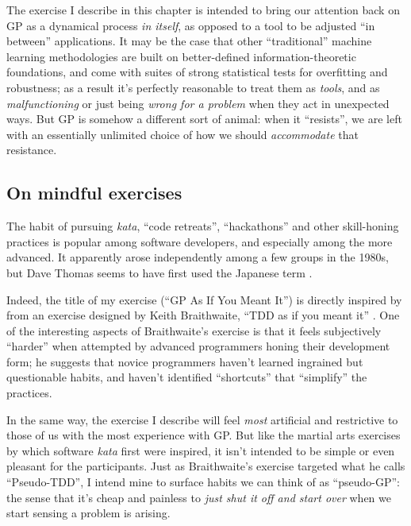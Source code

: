 The exercise I describe in this chapter is intended to bring our attention back on GP as a dynamical process \emph{in itself}, as opposed to a tool to be adjusted ``in between'' applications. It may be the case that other ``traditional'' machine learning methodologies are built on better-defined information-theoretic foundations, and come with suites of strong statistical tests for overfitting and robustness; as a result it's perfectly reasonable to treat them as \emph{tools}, and as \emph{malfunctioning} or just being \emph{wrong for a problem} when they act in unexpected ways. But GP is somehow a different sort of animal: when it ``resists'', we are left with an essentially unlimited choice of how we should \emph{accommodate} that resistance.

\subsection{On mindful exercises}\hypertarget{on-mindful-exercises}{}\label{on-mindful-exercises}

The habit of pursuing \emph{kata}, ``code retreats'', ``hackathons'' and other skill-honing practices is popular among software developers, and especially among the more advanced. It apparently arose independently among a few groups in the 1980s, but Dave Thomas seems to have first used the Japanese term \citep{Thomas2013}.

Indeed, the title of my exercise (``GP As If You Meant It'') is directly inspired by from an exercise designed by Keith Braithwaite, ``TDD as if you meant it'' \citep{Braithwaite2011}. One of the interesting aspects of Braithwaite's exercise is that it feels subjectively ``harder'' when attempted by advanced programmers honing their development form; he suggests that novice programmers haven't learned ingrained but questionable habits, and haven't identified ``shortcuts'' that ``simplify'' the practices.

In the same way, the exercise I describe will feel \emph{most} artificial and restrictive to those of us with the most experience with GP. But like the martial arts exercises by which software \emph{kata} first were inspired, it isn't intended to be simple or even pleasant for the participants. Just as Braithwaite's exercise targeted what he calls ``Pseudo-TDD'', I intend mine to surface habits we can think of as ``pseudo-GP'': the sense that it's cheap and painless to \emph{just shut it off and start over} when we start sensing a problem is arising.


